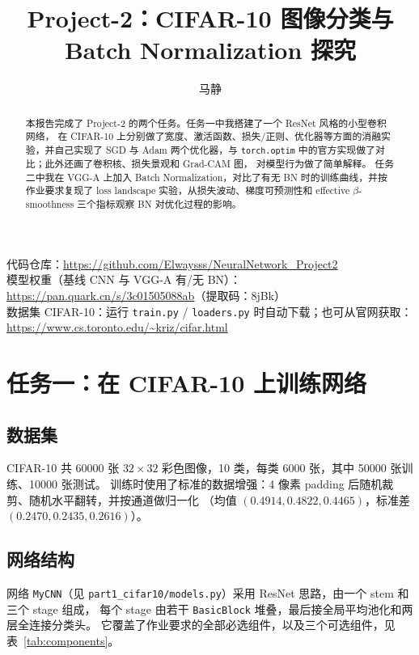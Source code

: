 \documentclass[11pt]{ctexart}
\title{Project-2：CIFAR-10 图像分类与 Batch Normalization 探究}
\author{马静\quad 23300180134}
\date{}
\begin{document}
\maketitle

\begin{center}
\small
代码仓库：\url{https://github.com/Elwaysss/NeuralNetwork_Project2}\\
模型权重（基线 CNN 与 VGG-A 有/无 BN）：\url{https://pan.quark.cn/s/3c01505088ab}（提取码：8jBk）\\
数据集 CIFAR-10：运行 \texttt{train.py} / \texttt{loaders.py} 时自动下载；也可从官网获取：\url{https://www.cs.toronto.edu/~kriz/cifar.html}
\end{center}

\begin{abstract}
本报告完成了 Project-2 的两个任务。任务一中我搭建了一个 ResNet 风格的小型卷积网络，
在 CIFAR-10 上分别做了宽度、激活函数、损失/正则、优化器等方面的消融实验，并自己实现了 SGD 与 Adam
两个优化器，与 \texttt{torch.optim} 中的官方实现做了对比；此外还画了卷积核、损失景观和 Grad-CAM 图，
对模型行为做了简单解释。
任务二中我在 VGG-A 上加入 Batch Normalization，对比了有无 BN 时的训练曲线，并按作业要求复现了
loss landscape 实验，从损失波动、梯度可预测性和 effective $\beta$-smoothness 三个指标观察 BN 对优化过程的影响。
\end{abstract}

\section{任务一：在 CIFAR-10 上训练网络}

\subsection{数据集}
CIFAR-10 共 60000 张 $32\times32$ 彩色图像，10 类，每类 6000 张，其中 50000 张训练、10000 张测试。
训练时使用了标准的数据增强：4 像素 padding 后随机裁剪、随机水平翻转，并按通道做归一化
（均值 $(0.4914,0.4822,0.4465)$，标准差 $(0.2470,0.2435,0.2616)$）。

\subsection{网络结构}
网络 \texttt{MyCNN}（见 \texttt{part1\_cifar10/models.py}）采用 ResNet 思路，由一个 stem 和三个 stage 组成，
每个 stage 由若干 \texttt{BasicBlock} 堆叠，最后接全局平均池化和两层全连接分类头。
它覆盖了作业要求的全部必选组件，以及三个可选组件，见表~\ref{tab:components}。
\end{document}
